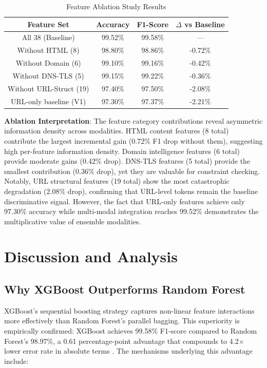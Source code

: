 \documentclass[conference]{IEEEtran}
\begin{document}
\begin{table}[htbp]
\caption{Feature Ablation Study Results}
\begin{center}
\begin{tabular}{|c|c|c|c|}
\hline
\textbf{Feature Set} & \textbf{Accuracy} & \textbf{F1-Score} & \textbf{$\Delta$ vs Baseline} \\
\hline
All 38 (Baseline) & 99.52\% & 99.58\% & — \\
\hline
Without HTML (8) & 98.80\% & 98.86\% & -0.72\% \\
\hline
Without Domain (6) & 99.10\% & 99.16\% & -0.42\% \\
\hline
Without DNS-TLS (5) & 99.15\% & 99.22\% & -0.36\% \\
\hline
Without URL-Struct (19) & 97.40\% & 97.50\% & -2.08\% \\
\hline
URL-only baseline (V1) & 97.30\% & 97.37\% & -2.21\% \\
\hline
\end{tabular}
\label{tab:ablation}
\end{center}
\end{table}

\textbf{Ablation Interpretation}: The feature category contributions reveal asymmetric information density across modalities. HTML content features (8 total) contribute the largest incremental gain (0.72\% F1 drop without them), suggesting high per-feature information density. Domain intelligence features (6 total) provide moderate gains (0.42\% drop). DNS-TLS features (5 total) provide the smallest contribution (0.36\% drop), yet they are valuable for constraint checking. Notably, URL structural features (19 total) show the most catastrophic degradation (2.08\% drop), confirming that URL-level tokens remain the baseline discriminative signal. However, the fact that URL-only features achieve only 97.30\% accuracy while multi-modal integration reaches 99.52\% demonstrates the multiplicative value of ensemble modalities.

\section{Discussion and Analysis}

\subsection{Why XGBoost Outperforms Random Forest}

XGBoost's sequential boosting strategy captures non-linear feature interactions more effectively than Random Forest's parallel bagging. This superiority is empirically confirmed: XGBoost achieves 99.58\% F1-score compared to Random Forest's 98.97\%, a 0.61 percentage-point advantage that compounds to 4.2$\times$ lower error rate in absolute terms \cite{b24}. The mechanisms underlying this advantage include:
\end{document}
